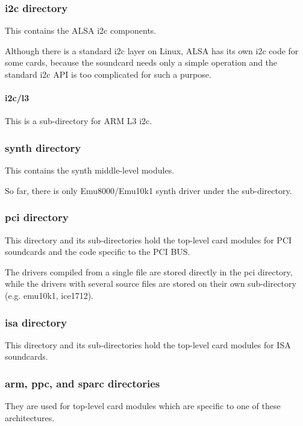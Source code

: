 \documentclass[a4paper,8pt,english]{sphinxmanual}
\begin{document}
\subsubsection{i2c directory}
\label{sound/kernel-api/writing-an-alsa-driver:i2c-directory}
This contains the ALSA i2c components.

Although there is a standard i2c layer on Linux, ALSA has its own i2c
code for some cards, because the soundcard needs only a simple operation
and the standard i2c API is too complicated for such a purpose.


\paragraph{i2c/l3}
\label{sound/kernel-api/writing-an-alsa-driver:i2c-l3}
This is a sub-directory for ARM L3 i2c.


\subsubsection{synth directory}
\label{sound/kernel-api/writing-an-alsa-driver:synth-directory}
This contains the synth middle-level modules.

So far, there is only Emu8000/Emu10k1 synth driver under the
 sub-directory.


\subsubsection{pci directory}
\label{sound/kernel-api/writing-an-alsa-driver:pci-directory}
This directory and its sub-directories hold the top-level card modules
for PCI soundcards and the code specific to the PCI BUS.

The drivers compiled from a single file are stored directly in the pci
directory, while the drivers with several source files are stored on
their own sub-directory (e.g. emu10k1, ice1712).


\subsubsection{isa directory}
\label{sound/kernel-api/writing-an-alsa-driver:isa-directory}
This directory and its sub-directories hold the top-level card modules
for ISA soundcards.


\subsubsection{arm, ppc, and sparc directories}
\label{sound/kernel-api/writing-an-alsa-driver:arm-ppc-and-sparc-directories}
They are used for top-level card modules which are specific to one of
these architectures.
\end{document}
